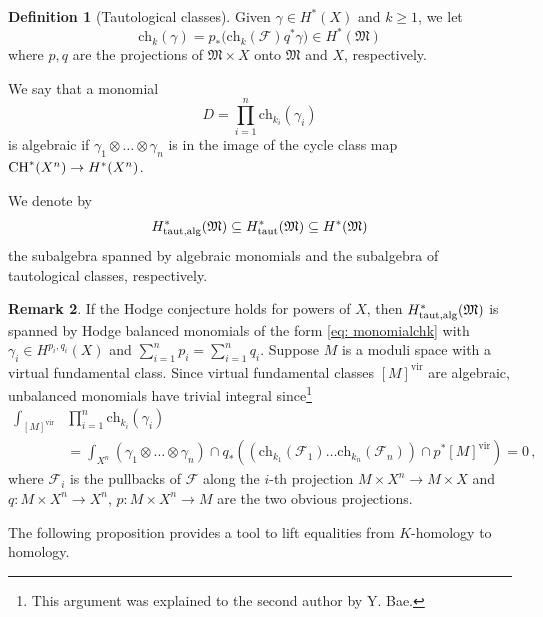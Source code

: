 \documentclass[12pt]{amsart}
\theoremstyle{definition}
\newtheorem{definition}{Definition}[section]
\newtheorem{remark}[definition]{Remark}
\newcommand{\CF}{{\mathcal F}}
\newcommand{\1}{\mathbf 1}
\newcommand{\FM}{{\mathfrak{M}}}
\newcommand{\ch}{\mathrm{ch}}
\newcommand{\vir}{\mathrm{vir}}
\begin{document}
\begin{definition}[Tautological classes]\label{def: tautclasses}
Given $\gamma\in H^\ast(X)$ and $k\geq 1$, we let
\[\ch_k(\gamma)=p_\ast\big(\ch_k(\CF)q^\ast\gamma\big)\in H^\ast(\FM)\]
where $p, q$ are the projections of $\FM\times X$ onto $\FM$ and $X$, respectively. 

We say that a monomial 
\begin{equation}
    \label{eq: monomialchk}
D=\prod_{i=1}^n \ch_{k_i}(\gamma_i)\end{equation}
is algebraic if $\gamma_1\otimes \ldots \otimes \gamma_n$ is in the image of the cycle class map $\textup{CH}^\ast(X^n)\to H^\ast(X^n)$. 

We denote by 
\[H^\ast_{\textup{taut,alg}}(\FM)\subseteq H^\ast_{\textup{taut}}(\FM) \subseteq H^\ast(\FM)\]
the subalgebra spanned by algebraic monomials and the subalgebra of tautological classes, respectively.
\end{definition}

\begin{remark}\label{rmk: hodgeconj}
    If the Hodge conjecture holds for powers of $X$, then $H^\ast_{\textup{taut,alg}}(\FM)$ is spanned by Hodge balanced monomials of the form \eqref{eq: monomialchk} with $\gamma_i\in H^{p_i, q_i}(X)$ and $\sum_{i=1}^n p_i=\sum_{i=1}^n q_i$. Suppose $M$ is a moduli space with a virtual fundamental class. Since virtual fundamental classes $[M]^\vir$ are algebraic, unbalanced monomials have trivial integral since\footnote{This argument was explained to the second author by Y. Bae.}
    \begin{align*}
        \nonumber\int_{[M]^\vir} &\prod_{i=1}^n \ch_{k_i}(\gamma_i)&\\
       & =\int_{X^n} (\gamma_1\otimes \ldots \otimes \gamma_n)\cap q_\ast\left((\ch_{k_1}(\CF_1)\ldots \ch_{k_n}(\CF_n))\cap p^\ast[M]^\vir\right)=0\,,
        \end{align*}
    where $\CF_i$ is the pullbacks of $\CF$ along the $i$-th projection $M\times X^n\to M\times X$ and $q\colon M\times X^n\to X^n$, $p\colon M\times X^n\to M$ are the two obvious projections.  
\end{remark}


The following proposition provides a tool to lift equalities from $K$-homology to homology.
\end{document}
